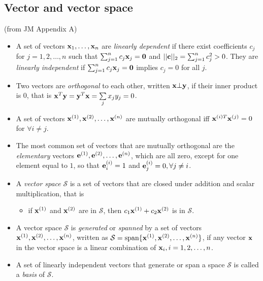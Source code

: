\newpage
\subsection*{Vector and vector space}

(from JM Appendix A)

\begin{itemize}
\item A set of vectors $\mathbf{x}_1, \dots, \mathbf{x}_n$ are {\it linearly dependent} if there exist coefficients $c_j$ for $j = 1, 2, \dots, n$ such that $\sum_{j=1}^{n}{c_j \mathbf{x}_j} = \mathbf{0}$ and $||\mathbf{c}||_2 = \sum_{j=1}^{n}{c_j^2}>0$.
They are {\it linearly independent} if  $\sum_{j=1}^{n}{c_j \mathbf{x}_j} = \mathbf{0}$ implies $c_j = 0$ for all $j$.

\item Two vectors are {\it orthogonal} to each other, written $\mathbf{x} \bot \mathbf{y}$, if their inner product is 0, that is $\mathbf{x}^T\mathbf{y} = \mathbf{y}^T\mathbf{x} = \sum\limits_{j}{x_j y_j} = 0$.

\item A set of vectors $\mathbf{x}^{(1)}, \mathbf{x}^{(2)}, \dots, \mathbf{x}^{(n)}$ are mutually orthogonal iff $\mathbf{x}^{(i)T}\mathbf{x}^{(j)} = 0$ for $\forall i \ne j$.

\item The most common set of vectors that are mutually orthogonal are the {\it elementary} vectors $\mathbf{e}^{(1)}, \mathbf{e}^{(2)}, \dots, \mathbf{e}^{(n)}$, which are all zero, except for one element equal to $1$, so that $\mathbf{e}^{(i)}_i = 1$ and $\mathbf{e}^{(i)}_j = 0, \forall j \ne i$.

\item A {\it vector space} $\mathcal{S}$ is a set of vectors that are closed under addition and scalar multiplication, that is 

  \begin{itemize}
    \item if $\mathbf{x}^{(1)}$ and $\mathbf{x}^{(2)}$ are in $\mathcal{S}$, then $c_1 \mathbf{x}^{(1)} + c_2 \mathbf{x}^{(2)}$ is in $\mathcal{S}$.
  \end{itemize}

\item A vector space $\mathcal{S}$ is {\it generated} or {\it spanned} by a set of vectors $\mathbf{x}^{(1)}, \mathbf{x}^{(2)}, \dots, \mathbf{x}^{(n)}$, written as $\mathcal{S} = \mbox{span}\{\mathbf{x}^{(1)}, \mathbf{x}^{(2)}, \dots, \mathbf{x}^{(n)}\}$, 
if any vector $\mathbf{x}$ in the vector space is a linear combination of $\mathbf{x}_i, i=1, 2, \dots, n$.

\item A set of linearly independent vectors that generate or span a space $\mathcal{S}$ is called a {\it basis} of $\mathcal{S}$.

\end{itemize}

